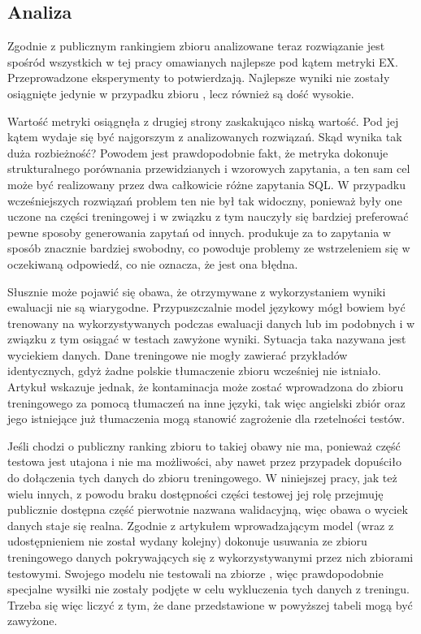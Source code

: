 \subsection{Analiza}
Zgodnie z publicznym rankingiem zbioru  analizowane teraz rozwiązanie jest spośród wszystkich w tej pracy omawianych najlepsze pod kątem metryki EX. Przeprowadzone eksperymenty to potwierdzają. Najlepsze wyniki nie zostały osiągnięte jedynie w przypadku zbioru , lecz również są dość wysokie.

Wartość metryki  osiągnęła z drugiej strony zaskakująco niską wartość. Pod jej kątem  wydaje się być najgorszym z analizowanych rozwiązań. Skąd wynika tak duża rozbieżność? Powodem jest prawdopodobnie fakt, że metryka  dokonuje strukturalnego porównania przewidzianych i wzorowych zapytania, a ten sam cel może być realizowany przez dwa całkowicie różne zapytania SQL. W przypadku wcześniejszych rozwiązań problem ten nie był tak widoczny, ponieważ były one uczone na części treningowej i w związku z tym nauczyły się bardziej preferować pewne sposoby generowania zapytań od innych.  produkuje za to zapytania w sposób znacznie bardziej swobodny, co powoduje problemy ze wstrzeleniem się w oczekiwaną odpowiedź, co nie oznacza, że jest ona błędna. 

Słusznie może pojawić się obawa, że otrzymywane z wykorzystaniem  wyniki ewaluacji nie są wiarygodne. Przypuszczalnie model językowy  mógł bowiem być trenowany na wykorzystywanych podczas ewaluacji danych lub im podobnych i w związku z tym osiągać w testach zawyżone wyniki. Sytuacja taka nazywana jest wyciekiem danych. Dane treningowe nie mogły zawierać przykładów identycznych, gdyż żadne polskie tłumaczenie zbioru  wcześniej nie istniało. Artykuł  \cite{Yang2023} wskazuje jednak, że kontaminacja może zostać wprowadzona do zbioru treningowego za pomocą tłumaczeń na inne języki, tak więc angielski zbiór  oraz jego istniejące już tłumaczenia mogą stanowić zagrożenie dla rzetelności testów.

Jeśli chodzi o publiczny ranking zbioru  to takiej obawy nie ma, ponieważ część testowa jest utajona i nie ma możliwości, aby  nawet przez przypadek dopuściło do dołączenia tych danych do zbioru treningowego. W niniejszej pracy, jak też wielu innych, z powodu braku dostępności części testowej jej rolę przejmuję publicznie dostępna część pierwotnie nazwana walidacyjną, więc obawa o wyciek danych staje się realna. Zgodnie z artykułem wprowadzającym model  \cite{Brown2020} (wraz z udostępnieniem  nie został wydany kolejny)  dokonuje usuwania ze zbioru treningowego danych pokrywających się z wykorzystywanymi przez nich zbiorami testowymi. Swojego modelu nie testowali na zbiorze , więc prawdopodobnie specjalne wysiłki nie zostały podjęte w celu wykluczenia tych danych z treningu. Trzeba się więc liczyć z tym, że dane przedstawione w powyższej tabeli mogą być zawyżone.

